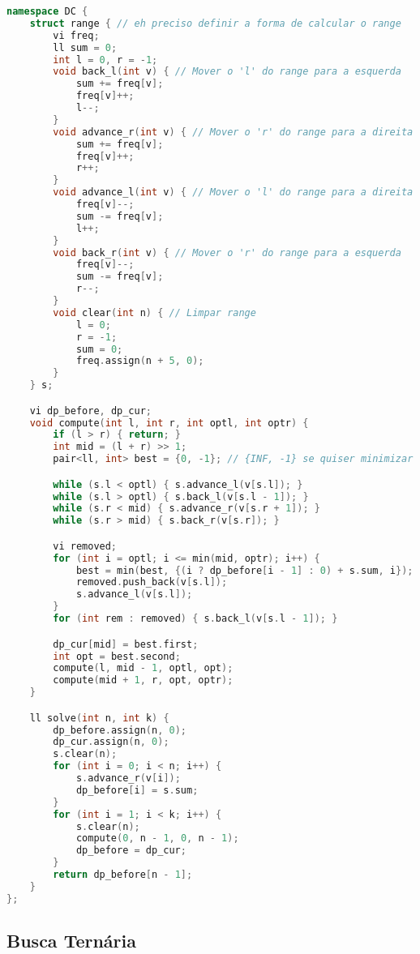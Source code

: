 \documentclass[11pt, a4paper, twoside]{article}
\begin{document}
\begin{lstlisting}[language=C++]
namespace DC {
    struct range { // eh preciso definir a forma de calcular o range
        vi freq;
        ll sum = 0;
        int l = 0, r = -1;
        void back_l(int v) { // Mover o 'l' do range para a esquerda
            sum += freq[v];
            freq[v]++;
            l--;
        }
        void advance_r(int v) { // Mover o 'r' do range para a direita
            sum += freq[v];
            freq[v]++;
            r++;
        }
        void advance_l(int v) { // Mover o 'l' do range para a direita
            freq[v]--;
            sum -= freq[v];
            l++;
        }
        void back_r(int v) { // Mover o 'r' do range para a esquerda
            freq[v]--;
            sum -= freq[v];
            r--;
        }
        void clear(int n) { // Limpar range
            l = 0;
            r = -1;
            sum = 0;
            freq.assign(n + 5, 0);
        }
    } s;

    vi dp_before, dp_cur;
    void compute(int l, int r, int optl, int optr) {
        if (l > r) { return; }
        int mid = (l + r) >> 1;
        pair<ll, int> best = {0, -1}; // {INF, -1} se quiser minimizar

        while (s.l < optl) { s.advance_l(v[s.l]); }
        while (s.l > optl) { s.back_l(v[s.l - 1]); }
        while (s.r < mid) { s.advance_r(v[s.r + 1]); }
        while (s.r > mid) { s.back_r(v[s.r]); }

        vi removed;
        for (int i = optl; i <= min(mid, optr); i++) {
            best = min(best, {(i ? dp_before[i - 1] : 0) + s.sum, i}); // min() se quiser minimizar
            removed.push_back(v[s.l]);
            s.advance_l(v[s.l]);
        }
        for (int rem : removed) { s.back_l(v[s.l - 1]); }

        dp_cur[mid] = best.first;
        int opt = best.second;
        compute(l, mid - 1, optl, opt);
        compute(mid + 1, r, opt, optr);
    }

    ll solve(int n, int k) {
        dp_before.assign(n, 0);
        dp_cur.assign(n, 0);
        s.clear(n);
        for (int i = 0; i < n; i++) {
            s.advance_r(v[i]);
            dp_before[i] = s.sum;
        }
        for (int i = 1; i < k; i++) {
            s.clear(n);
            compute(0, n - 1, 0, n - 1);
            dp_before = dp_cur;
        }
        return dp_before[n - 1];
    }
};
\end{lstlisting}

\subsection{Busca Ternária}
\end{document}
